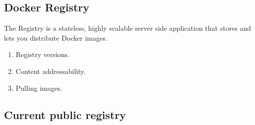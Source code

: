 \subsection{Docker Registry}

The Registry is a stateless, highly scalable server side application that stores and lets you distribute Docker images.

\begin{enumerate}
	\item Registry versions.
	\item Content addressability.
	\item Pulling images.
\end{enumerate}

\subsection{Current public registry}
